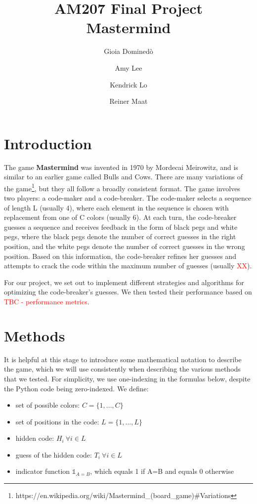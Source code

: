 \documentclass[11pt]{article}
\title{AM207 Final Project \\ Mastermind}
\author{Gioia Domined\`o \and Amy Lee \and Kendrick Lo \and Reiner Maat}
\begin{document}
\maketitle{}


\begin{abstract}
\end{abstract}

\section{Introduction}

The game \textbf{Mastermind} was invented in 1970 by Mordecai Meirowitz, and is similar to an earlier game called Bulls and Cows. There are many variations of the game\footnote{https://en.wikipedia.org/wiki/Mastermind\_(board\_game)\#Variations}, but they all follow a broadly consistent format. The game involves two players: a code-maker and a code-breaker. The code-maker selects a sequence of length L (usually 4), where each element in the sequence is chosen with replacement from one of C colors (usually 6). At each turn, the code-breaker guesses a sequence and receives feedback in the form of black pegs and white pegs, where the black pegs denote the number of correct guesses in the right position, and the white pegs denote the number of correct guesses in the wrong position. Based on this information, the code-breaker refines her guesses and attempts to crack the code within the maximum number of guesses (usually \textcolor{red}{XX}).

For our project, we set out to implement different strategies and algorithms for optimizing the code-breaker's guesses. We then tested their performance based on \textcolor{red}{TBC - performance metrics}.

\section{Methods}

It is helpful at this stage to introduce some mathematical notation to describe the game, which we will use consistently when describing the various methods that we tested. For simplicity, we use one-indexing in the formulas below, despite the Python code being zero-indexed.  We define:
\begin{itemize}
\item set of possible colors: $C = \{1, ..., C\}$
\item set of positions in the code: $L = \{1, ..., L\}$
\item hidden code: $H_i \ \forall i \in L$
\item guess of the hidden code: $T_i \ \forall i \in L$
\item indicator function $\mathbb{1}_{A=B}$, which equals 1 if A=B and equals 0 otherwise
\end{itemize}
\end{document}
